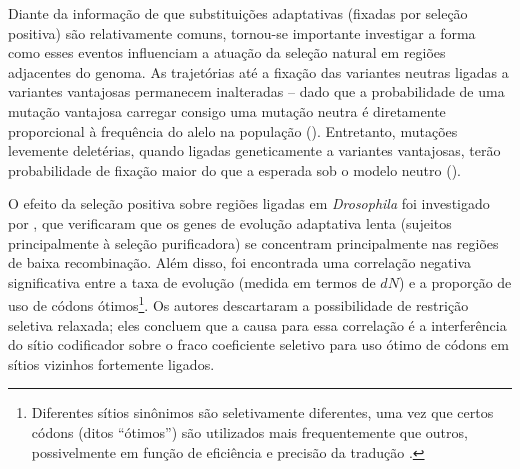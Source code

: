 \begin{refsection}



Diante da informação de que substituições adaptativas (fixadas por seleção positiva) são relativamente comuns, tornou-se importante investigar a forma como esses eventos influenciam a atuação da seleção natural em regiões adjacentes do genoma. As trajetórias até a fixação das variantes neutras ligadas a variantes vantajosas permanecem inalteradas -- dado que a probabilidade de uma mutação vantajosa carregar consigo uma mutação neutra é diretamente proporcional à frequência do alelo na população (\cite{Walsh1988,Chun2011,Comeron2008,Harris2010,Charlesworth2012}). Entretanto, mutações levemente deletérias, quando ligadas geneticamente a variantes vantajosas, terão probabilidade de fixação maior do que a esperada sob o modelo neutro (\cite{Lynch2007}).





O efeito da seleção positiva sobre regiões ligadas em \emph{Drosophila} foi investigado por \textcite{Betancourt2002}, que verificaram que os genes de evolução adaptativa lenta (sujeitos principalmente à seleção purificadora) se concentram principalmente nas regiões de baixa recombinação. Além disso, foi encontrada uma correlação negativa significativa entre a taxa de evolução (medida em termos de $dN$) e a proporção de uso de códons ótimos\footnote{Diferentes sítios sinônimos são seletivamente diferentes, uma vez que certos códons (ditos “ótimos”) são utilizados mais frequentemente que outros, possivelmente em função de eficiência e precisão da tradução \parencite{Betancourt2002}.}. Os autores descartaram a possibilidade de restrição seletiva relaxada; eles concluem que a causa para essa correlação é a interferência do sítio codificador sobre o fraco coeficiente seletivo para uso ótimo de códons em sítios vizinhos fortemente ligados.


\end{refsection}
